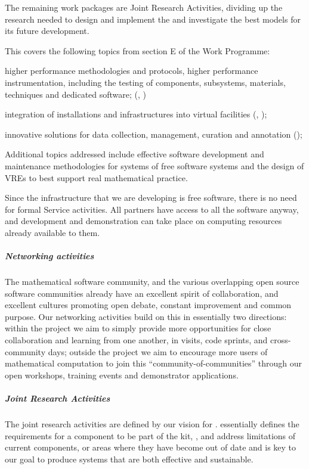 The remaining work packages are Joint Research Activities, dividing up
the research needed to design and implement the \TheProject and
investigate the best models for its future development. 

This covers the following topics from section E of the Work Programme:

\begin{compactitem}
\item higher performance methodologies and protocols, higher performance instrumentation,
  including the testing of components, subsystems, materials, techniques and dedicated
  software; (, )
\item integration of installations and infrastructures into virtual
  facilities (, );
\item innovative solutions for data collection, management, curation
  and annotation ();
\end{compactitem}


Additional topics addressed include effective software development and
maintenance methodologies for systems of free software systems and the
design of VREs to best support real mathematical practice.

Since the infrastructure that we are developing is free software,
there is no need for formal Service activities. All partners have
access to all the software anyway, and development and demonstration
can take place on computing resources already available to them.

\subparagraph{Networking activities}
The mathematical software community, and the various overlapping open
source software communities already have an excellent spirit of
collaboration, and excellent cultures promoting open debate, constant
improvement and common purpose. Our networking activities build on
this in essentially two directions: within the project we aim to
simply provide more opportunities for close collaboration and learning
from one another, in visits, code sprints, and cross-community days;
outside the project we aim to encourage more users of mathematical
computation to join this ``community-of-communities'' through our open
workshops, training events and demonstrator applications.



\subparagraph{Joint Research Activities} The joint research activities are defined by our
vision for \TheProject.  essentially defines the
requirements for a component to be part of the kit, ,  and
 address limitations of current components, or areas where they have
become out of date and  is key to our goal to produce systems that
are both effective and sustainable.


